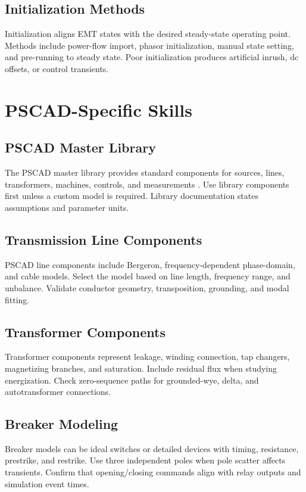 \documentclass[11pt]{article}
\begin{document}
\subsection{Initialization Methods}
Initialization aligns EMT states with the desired steady-state operating point. Methods include power-flow import, phasor initialization, manual state setting, and pre-running to steady state. Poor initialization produces artificial inrush, dc offsets, or control transients.

\section{PSCAD-Specific Skills}
\subsection{PSCAD Master Library}
The PSCAD master library provides standard components for sources, lines, transformers, machines, controls, and measurements \cite{pscad}. Use library components first unless a custom model is required. Library documentation states assumptions and parameter units.

\subsection{Transmission Line Components}
PSCAD line components include Bergeron, frequency-dependent phase-domain, and cable models. Select the model based on line length, frequency range, and unbalance. Validate conductor geometry, transposition, grounding, and modal fitting.

\subsection{Transformer Components}
Transformer components represent leakage, winding connection, tap changers, magnetizing branches, and saturation. Include residual flux when studying energization. Check zero-sequence paths for grounded-wye, delta, and autotransformer connections.

\subsection{Breaker Modeling}
Breaker models can be ideal switches or detailed devices with timing, resistance, prestrike, and restrike. Use three independent poles when pole scatter affects transients. Confirm that opening/closing commands align with relay outputs and simulation event times.
\end{document}
